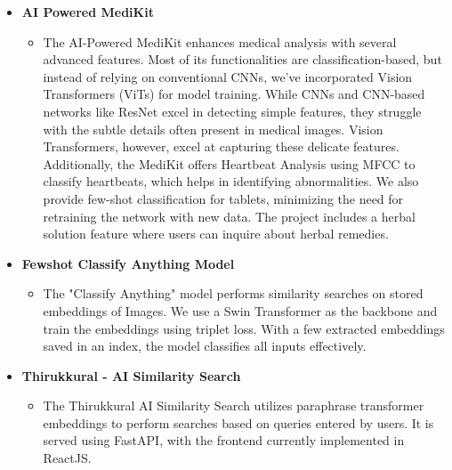 \documentclass[letterpaper,11pt]{article}
\newcommand{\resitem}[1]{\item #1 \vspace{-2pt}}
\newcommand{\resheading}[1]{\textbf{\sffamily{\mbox{~}{\large #1} \vphantom{p\^{E}}}}}
\begin{document}
\resheading{Projects}
\begin{itemize}
\item[]
	\textbf{AI Powered MediKit}
	\vspace{-3mm}
	\begin{itemize}
		\resitem{The AI-Powered MediKit enhances medical analysis with several advanced features. Most of its functionalities are classification-based, but instead of relying on conventional CNNs, we've incorporated Vision Transformers (ViTs) for model training. While CNNs and CNN-based networks like ResNet excel in detecting simple features, they struggle with the subtle details often present in medical images. Vision Transformers, however, excel at capturing these delicate features. Additionally, the MediKit offers Heartbeat Analysis using MFCC to classify heartbeats, which helps in identifying abnormalities. We also provide few-shot classification for tablets, minimizing the need for retraining the network with new data. The project includes a herbal solution feature where users can inquire about herbal remedies.}
	\end{itemize}

\item[]
	\textbf{Fewshot Classify Anything Model}
	\vspace{-3mm}
	\begin{itemize}
	    \resitem{The "Classify Anything" model performs similarity searches on stored embeddings of Images. We use a Swin Transformer as the backbone and train the embeddings using triplet loss. With a few extracted embeddings saved in an index, the model classifies all inputs effectively.}
	\end{itemize}

\item[]
	\textbf{Thirukkural - AI Similarity Search}
	\vspace{-3mm}
	\begin{itemize}
		\resitem{The Thirukkural AI Similarity Search utilizes paraphrase transformer embeddings to perform searches based on queries entered by users. It is served using FastAPI, with the frontend currently implemented in ReactJS.}
	\end{itemize}

\end{itemize}
\end{document}
